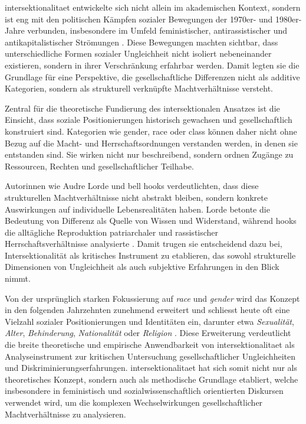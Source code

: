 \gls{intersektionalitaet} entwickelte sich nicht allein im akademischen Kontext, sondern ist eng mit den politischen Kämpfen sozialer Bewegungen der 1970er- und 1980er-Jahre verbunden, insbesondere im Umfeld feministischer, antirassistischer und antikapitalistischer Strömungen \parencite{collinsBlackFeministThought2002}. Diese Bewegungen machten sichtbar, dass unterschiedliche Formen sozialer Ungleichheit nicht isoliert nebeneinander existieren, sondern in ihrer Verschränkung erfahrbar werden. Damit legten sie die Grundlage für eine Perspektive, die gesellschaftliche Differenzen nicht als additive Kategorien, sondern als strukturell verknüpfte Machtverhältnisse versteht.

Zentral für die theoretische Fundierung des intersektionalen Ansatzes ist die Einsicht, dass soziale Positionierungen historisch gewachsen und gesellschaftlich konstruiert sind. Kategorien wie \gls{gender}, \gls{race} oder \gls{class} können daher nicht ohne Bezug auf die Macht- und Herrschaftsordnungen verstanden werden, in denen sie entstanden sind. Sie wirken nicht nur beschreibend, sondern ordnen Zugänge zu Ressourcen, Rechten und gesellschaftlicher Teilhabe.

Autorinnen wie Audre Lorde und bell hooks verdeutlichten, dass diese strukturellen Machtverhältnisse nicht abstrakt bleiben, sondern konkrete Auswirkungen auf individuelle Lebensrealitäten haben. Lorde betonte die Bedeutung von Differenz als Quelle von Wissen und Widerstand, während hooks die alltägliche Reproduktion patriarchaler und rassistischer Herrschaftsverhältnisse analysierte \parencite{collinsBlackFeministThought2002, hancockWhenMultiplicationDoesnt2007}. Damit trugen sie entscheidend dazu bei, Intersektionalität als kritisches Instrument zu etablieren, das sowohl strukturelle Dimensionen von Ungleichheit als auch subjektive Erfahrungen in den Blick nimmt.

Von der ursprünglich starken Fokussierung auf \textit{race} und \textit{gender} wird das Konzept in den folgenden Jahrzehnten zunehmend erweitert und schliesst heute oft eine Vielzahl sozialer Positionierungen und Identitäten ein, darunter etwa \emph{Sexualität}, \emph{Alter}, \emph{Behinderung}, \emph{Nationalität} oder \emph{Religion} \parencite{bauerIntersectionalityQuantitativeResearch2021, bowlegInvitedReflectionQuantifying2016}. Diese Erweiterung verdeutlicht die breite theoretische und empirische Anwendbarkeit von \gls{intersektionalitaet} als Analyseinstrument zur kritischen Untersuchung gesellschaftlicher Ungleichheiten und Diskriminierungserfahrungen. \gls{intersektionalitaet} hat sich somit nicht nur als theoretisches Konzept, sondern auch als methodische Grundlage etabliert, welche insbesondere in feministisch und sozialwissenschaftlich orientierten Diskursen verwendet wird, um die komplexen Wechselwirkungen gesellschaftlicher Machtverhältnisse zu analysieren.

